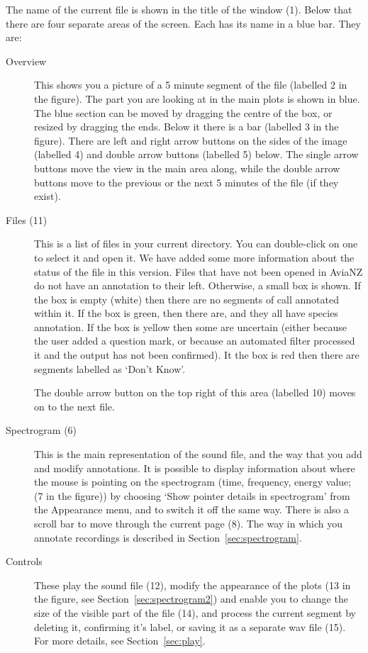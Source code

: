 \documentclass{article}
\begin{document}
The name of the current file is shown in the title of the window (1). Below that there are four separate areas of the screen. Each has its name in a blue bar. They are:
	\begin{description}
	\item[Overview] This shows you a picture of a 5 minute segment of the file (labelled 2 in the figure). The part you are looking at in the main plots is shown in blue. The blue section can be moved by dragging the centre of the box, or resized by dragging the ends. Below it there is a bar (labelled 3 in the figure). There are left and right arrow buttons on the sides of the image (labelled 4) and double arrow buttons (labelled 5) below. The single arrow buttons move the view in the main area along, while the double arrow buttons move to the previous or the next 5 minutes of the file (if they exist). 
	\item [Files (11)] This is a list of files in your current directory. You can double-click on one to select it and open it. We have added some more information about the status of the file in this version. Files that have not been opened in AviaNZ do not have an annotation to their left. Otherwise, a small box is shown. If the box is empty (white) then there are no segments of call annotated within it. If the box is green, then there are, and they all have species annotation. If the box is yellow then some are uncertain (either because the user added a question mark, or because an automated filter processed it and the output has not been confirmed). It the box is red then there are segments labelled as `Don't Know'. 

The double arrow button on the top right of this area (labelled 10) moves on to the next file.
	\item[Spectrogram (6)] This is the main representation of the sound file, and the way that you add and modify annotations. It is possible to display information about where the mouse is pointing on the spectrogram (time, frequency, energy value; (7 in the figure)) by choosing `Show pointer details in spectrogram' from the Appearance menu, and to switch it off the same way. There is also a scroll bar to move through the current page (8).
The way in which you annotate recordings is described in Section~\ref{sec:spectrogram}.
	\item[Controls] These play the sound file (12), modify the appearance of the plots (13 in the figure, see Section~\ref{sec:spectrogram2}) and enable you to change the size of the visible part of the file (14), and process the current segment by deleting it, confirming it's label, or saving it as a separate wav file (15).  For more details, see  Section~\ref{sec:play}.
	\end{description}
\end{document}

